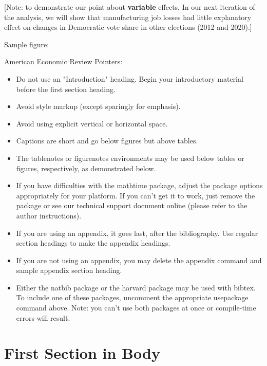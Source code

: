 \documentclass[]{AEA}
\begin{document}
{[}Note: to demonstrate our point about \textbf{variable} effects, In
our next iteration of the analysis, we will show that manufacturing job
losses had little explanatory effect on changes in Democratic vote share
in other elections (2012 and 2020).{]}

Sample figure:

American Economic Review Pointers:

\begin{itemize}
\item Do not use an "Introduction" heading. Begin your introductory material
before the first section heading.

\item Avoid style markup (except sparingly for emphasis).

\item Avoid using explicit vertical or horizontal space.

\item Captions are short and go below figures but above tables.

\item The tablenotes or figurenotes environments may be used below tables
or figures, respectively, as demonstrated below.

\item If you have difficulties with the mathtime package, adjust the package
options appropriately for your platform. If you can't get it to work, just
remove the package or see our technical support document online (please
refer to the author instructions).

\item If you are using an appendix, it goes last, after the bibliography.
Use regular section headings to make the appendix headings.

\item If you are not using an appendix, you may delete the appendix command
and sample appendix section heading.

\item Either the natbib package or the harvard package may be used with bibtex.
To include one of these packages, uncomment the appropriate usepackage command
above. Note: you can't use both packages at once or compile-time errors will result.

\end{itemize}

\section{First Section in Body}
\end{document}
